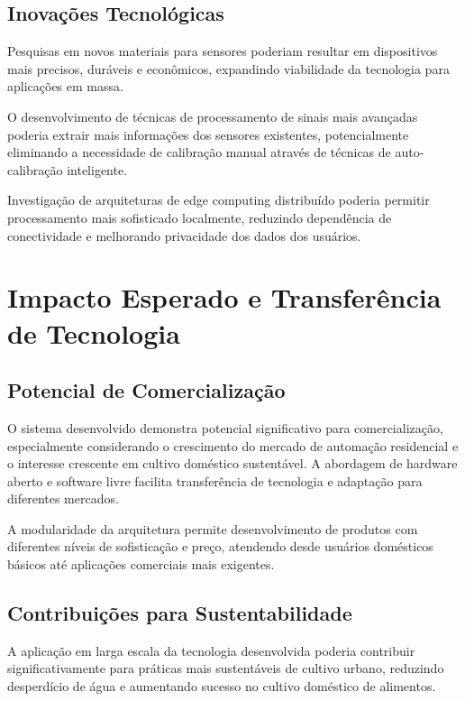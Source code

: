 \subsection{Inovações Tecnológicas}

Pesquisas em novos materiais para sensores poderiam resultar em dispositivos mais precisos, duráveis e econômicos, expandindo viabilidade da tecnologia para aplicações em massa.

O desenvolvimento de técnicas de processamento de sinais mais avançadas poderia extrair mais informações dos sensores existentes, potencialmente eliminando a necessidade de calibração manual através de técnicas de auto-calibração inteligente.

Investigação de arquiteturas de edge computing distribuído poderia permitir processamento mais sofisticado localmente, reduzindo dependência de conectividade e melhorando privacidade dos dados dos usuários.

\section{Impacto Esperado e Transferência de Tecnologia}

\subsection{Potencial de Comercialização}

O sistema desenvolvido demonstra potencial significativo para comercialização, especialmente considerando o crescimento do mercado de automação residencial e o interesse crescente em cultivo doméstico sustentável. A abordagem de hardware aberto e software livre facilita transferência de tecnologia e adaptação para diferentes mercados.

A modularidade da arquitetura permite desenvolvimento de produtos com diferentes níveis de sofisticação e preço, atendendo desde usuários domésticos básicos até aplicações comerciais mais exigentes.

\subsection{Contribuições para Sustentabilidade}

A aplicação em larga escala da tecnologia desenvolvida poderia contribuir significativamente para práticas mais sustentáveis de cultivo urbano, reduzindo desperdício de água e aumentando sucesso no cultivo doméstico de alimentos.

